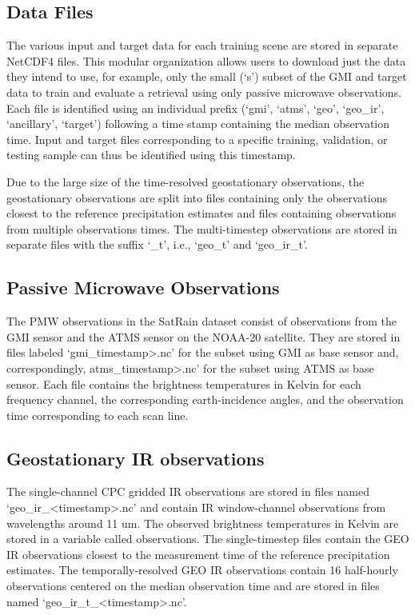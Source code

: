 \documentclass[11pt]{article}
\begin{document}
\subsection{Data Files}

The various input and target data for each training scene are stored in separate
NetCDF4 files. This modular organization allows users to download just the data
they intend to use, for example, only the small (‘s’) subset of the GMI and
target data to train and evaluate a retrieval using only passive microwave
observations. Each file is identified using an individual prefix (‘gmi’, ‘atms’,
‘geo’, ‘geo\_ir’, ‘ancillary’, ‘target’) following a time stamp containing the
median observation time. Input and target files corresponding to a specific
training, validation, or testing sample can thus be identified using this
timestamp.

Due to the large size of the time-resolved geostationary observations, the
geostationary observations are split into files containing only the observations
closest to the reference precipitation estimates and files containing
observations from multiple observations times. The multi-timestep observations
are stored in separate files with the suffix ‘\_t’, i.e., ‘geo\_t’ and ‘geo\_ir\_t’.

\subsection{Passive Microwave Observations}

The PMW observations in the SatRain dataset consist of observations from the GMI
sensor and the ATMS sensor on the NOAA-20 satellite. They are stored in files
labeled ‘gmi\_\<timestamp>.nc’ for the subset using GMI as base sensor and,
correspondingly, atms\_\<timestamp>.nc’ for the subset using ATMS as base sensor.
Each file contains the brightness temperatures in Kelvin for each frequency
channel, the corresponding earth-incidence angles, and the observation time
corresponding to each scan line.

\subsection{Geostationary IR observations}

The single-channel CPC gridded IR observations are stored in files named
‘geo\_ir\_<timestamp>.nc’ and contain IR window-channel observations from
wavelengths around 11 um. The observed brightness temperatures in Kelvin are
stored in a variable called observations. The single-timestep files contain the
GEO IR observations closest to the measurement time of the reference
precipitation estimates. The temporally-resolved GEO IR observations contain 16
half-hourly observations centered on the median observation time and are stored
in files named ‘geo\_ir\_t\_<timestamp>.nc’.
\end{document}

